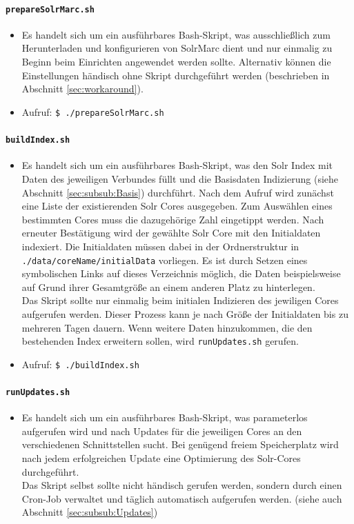 \documentclass[10pt]{article}
\begin{document}
\paragraph{\texttt{prepareSolrMarc.sh}}
\label{sec:para:prepareSolrMarc}
\begin{itemize}
	\item Es handelt sich um ein ausführbares Bash-Skript, was ausschließlich zum Herunterladen und konfigurieren von SolrMarc dient und nur einmalig zu Beginn beim Einrichten angewendet werden sollte. Alternativ können die Einstellungen händisch ohne Skript durchgeführt werden (beschrieben in Abschnitt \ref{sec:workaround}).
	\item Aufruf: \texttt{\$ ./prepareSolrMarc.sh}
\end{itemize}


\paragraph{\texttt{buildIndex.sh}}
\label{sec:para:buildIndex}
\begin{itemize}
	\item Es handelt sich um ein ausführbares Bash-Skript, was den Solr Index mit Daten des jeweiligen Verbundes füllt und die Basisdaten Indizierung (siehe Abschnitt \ref{sec:subsub:Basis}) durchführt. Nach dem Aufruf wird zunächst eine Liste der existierenden Solr Cores ausgegeben. Zum Auswählen eines bestimmten Cores muss die dazugehörige Zahl eingetippt werden. Nach erneuter Bestätigung wird der gewählte Solr Core mit den Initialdaten indexiert. Die Initialdaten müssen dabei in der Ordnerstruktur in \texttt{./data/coreName/initialData} vorliegen. Es ist durch Setzen eines symbolischen Links auf dieses Verzeichnis möglich, die Daten beispielsweise auf Grund ihrer Gesamtgröße an einem anderen Platz zu hinterlegen. \\
	Das Skript sollte nur einmalig beim initialen Indizieren des jewiligen Cores aufgerufen werden. Dieser Prozess kann je nach Größe der Initialdaten bis zu mehreren Tagen dauern. Wenn weitere Daten hinzukommen, die den bestehenden Index erweitern sollen, wird \texttt{runUpdates.sh} gerufen.
	\item Aufruf: \texttt{\$ ./buildIndex.sh}
\end{itemize}

\paragraph{\texttt{runUpdates.sh}}
\label{sec:para:runUpdates}
\begin{itemize}
	\item Es handelt sich um ein ausführbares Bash-Skript, was parameterlos aufgerufen wird und nach Updates für die jeweiligen Cores an den verschiedenen Schnittstellen sucht. Bei genügend freiem Speicherplatz wird nach jedem erfolgreichen Update eine Optimierung des Solr-Cores durchgeführt. \\
	Das Skript selbst sollte nicht händisch gerufen werden, sondern durch einen Cron-Job verwaltet und täglich automatisch aufgerufen werden. (siehe auch Abschnitt \ref{sec:subsub:Updates})
\end{itemize}
\end{document}
